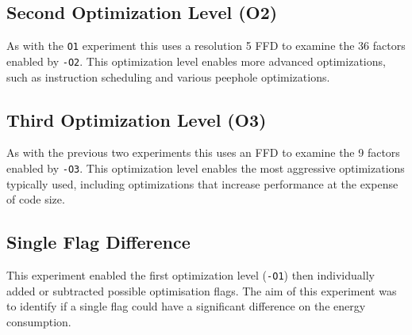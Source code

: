 \documentclass[twocolumn]{article}
\begin{document}
\subsection*{Second Optimization Level (O2)}

As with the \texttt{O1} experiment this uses a resolution 5 FFD to examine the 36 factors enabled by \texttt{-O2}. This optimization level enables more advanced optimizations, such as instruction scheduling and various peephole optimizations.

\subsection*{Third Optimization Level (O3)}

As with the previous two experiments this uses an FFD to examine the 9 factors enabled by \texttt{-O3}. This optimization level enables the most aggressive optimizations typically used, including optimizations that increase performance at the expense of code size.



\subsection*{Single Flag Difference}

This experiment enabled the first optimization level (\texttt{-O1}) then individually added or subtracted possible optimisation flags. The aim of this experiment was to identify if a single flag could have a significant difference on the energy consumption.


\end{document}
